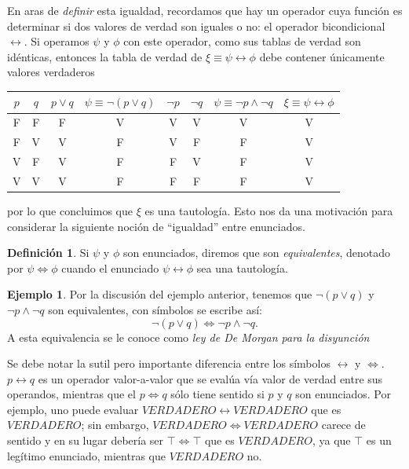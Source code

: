 \documentclass{book}
\theoremstyle{definition}
\newtheorem{df}{Definición}[chapter]
\newtheorem{ejm}{Ejemplo}[chapter]
\begin{document}
En aras de \emph{definir} esta igualdad,  recordamos que hay un operador cuya función es determinar si dos valores de verdad son iguales o no: el operador bicondicional $\leftrightarrow$.
Si operamos $\psi$ y $\phi$ con este operador, como sus tablas de verdad son idénticas, entonces la tabla de verdad de $\xi \equiv \psi \leftrightarrow \phi$ debe contener únicamente valores verdaderos
\begin{center}\begin{tabular}{|c|c||c|c|c|c|c|c|}
		\hline
		$p$ & $q$ & $p\vee q$ & $\psi \equiv \neg (p \vee q)$ & $\neg p$ & $\neg q$ & $\psi \equiv \neg p \wedge \neg q$ & $\xi \equiv \psi \leftrightarrow \phi$ \\
		\hline\hline
		F & F & F & V & V & V & V & V \\ \hline
		F & V & V & F & V & F & F & V \\ \hline
		V & F & V & F & F & V & F & V \\ \hline
		V & V & V & F & F & F & F & V \\ \hline
\end{tabular}\end{center}
por lo que concluimos que $\xi$ es una tautología.
Esto nos da una motivación para considerar la siguiente noción de ``igualdad'' entre enunciados.
\begin{df}\label{df_equivalenciaLogica}
	Si $\psi$ y $\phi$ son enunciados, diremos que son \emph{equivalentes}, denotado por $\psi \iff \phi$ cuando el enunciado $\psi \leftrightarrow \phi$ sea una tautología.
\end{df}

\begin{ejm}
	Por la discusión del ejemplo anterior, tenemos que $\neg (p \vee q)$ y $\neg p \wedge \neg q$ son equivalentes, con símbolos se escribe así: \[\neg (p \vee q) \iff \neg p \wedge \neg q.\]
	A esta equivalencia se le conoce como \emph{ley de De Morgan para la disyunción}
\end{ejm}

Se debe notar la sutil pero importante diferencia entre los símbolos $\leftrightarrow$ y $\iff$.
$p\leftrightarrow q$ es un operador valor-a-valor que se evalúa vía valor de verdad entre sus operandos, mientras que el $p\iff q$ sólo tiene sentido si $p$ y $q$ son enunciados.
Por ejemplo, uno puede evaluar $VERDADERO \leftrightarrow VERDADERO$ que es $VERDADERO$; sin embargo, $VERDADERO \iff VERDADERO$ carece de sentido y en su lugar debería ser $\top \iff \top$ que es $VERDADERO$, ya que $\top$ es un legítimo enunciado, mientras que $VERDADERO$ no.
\end{document}

